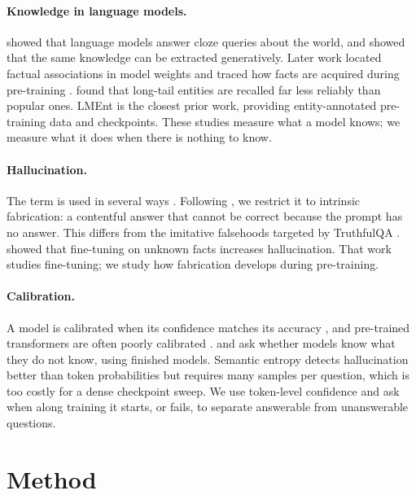\documentclass[11pt]{article}
\begin{document}
\paragraph{Knowledge in language models.}
\citet{petroni2019lama} showed that language models answer cloze queries about the world, and \citet{roberts2020knowledge} showed that the same knowledge can be extracted generatively. Later work located factual associations in model weights \citep{geva2023dissecting} and traced how facts are acquired during pre-training \citep{chang2024dynamics}. \citet{mallen2023popqa} found that long-tail entities are recalled far less reliably than popular ones. LMEnt \citep{gottesman2025lment} is the closest prior work, providing entity-annotated pre-training data and checkpoints. These studies measure what a model knows; we measure what it does when there is nothing to know.

\paragraph{Hallucination.}
The term is used in several ways \citep{ji2023survey}. Following \citet{maynez2020faithfulness}, we restrict it to intrinsic fabrication: a contentful answer that cannot be correct because the prompt has no answer. This differs from the imitative falsehoods targeted by TruthfulQA \citep{lin2022truthfulqa}. \citet{gekhman2024finetune} showed that fine-tuning on unknown facts increases hallucination. That work studies fine-tuning; we study how fabrication develops during pre-training.

\paragraph{Calibration.}
A model is calibrated when its confidence matches its accuracy \citep{naeini2015ece,guo2017calibration}, and pre-trained transformers are often poorly calibrated \citep{desai2020calibration}. \citet{kadavath2022know} and \citet{yin2023unknown} ask whether models know what they do not know, using finished models. Semantic entropy \citep{farquhar2024detecting} detects hallucination better than token probabilities but requires many samples per question, which is too costly for a dense checkpoint sweep. We use token-level confidence and ask when along training it starts, or fails, to separate answerable from unanswerable questions.

\section{Method}
\end{document}
